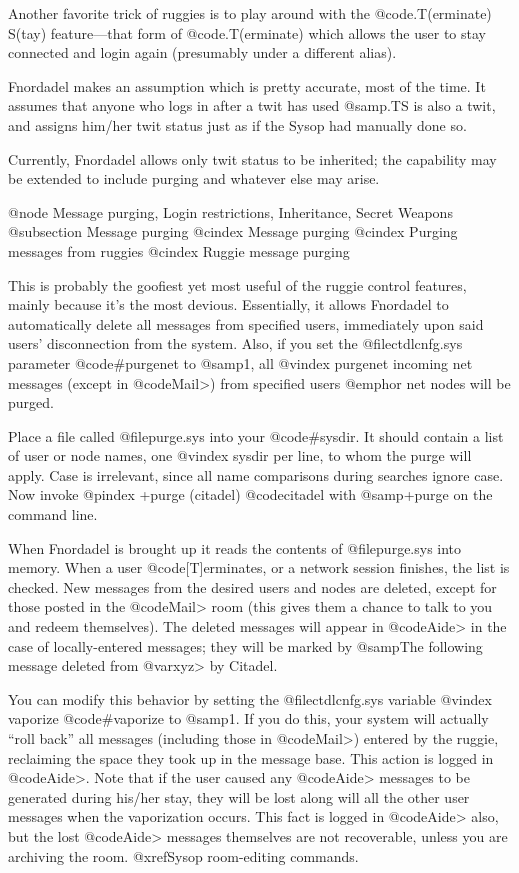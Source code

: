 Another favorite trick of ruggies is to play
around with the @code{.T(erminate) S(tay)} feature---that form
of @code{.T(erminate)} which allows the user to stay connected
and login again (presumably under a different alias).

Fnordadel makes an assumption which is pretty
accurate, most of the time.  It assumes that anyone who
logs in after a twit has used @samp{.TS} is also a twit, and
assigns him/her twit status just as if the Sysop had
manually done so.

Currently, Fnordadel allows only twit status
to be inherited; the capability may be extended to
include purging and whatever else may arise.

@node Message purging, Login restrictions, Inheritance, Secret Weapons
@subsection Message purging
@cindex Message purging
@cindex Purging messages from ruggies
@cindex Ruggie message purging

This is probably the goofiest yet most useful of the ruggie
control features, mainly because it's the most devious.
Essentially, it allows Fnordadel to automatically
delete all messages from specified users, immediately
upon said users' disconnection from the system.  Also, if
you set the @file{ctdlcnfg.sys} parameter @code{#purgenet} to @samp{1}, all
@vindex purgenet
incoming net messages (except in @code{Mail>}) from specified
users @emph{or net nodes} will be purged.

Place a file called @file{purge.sys} into your
@code{#sysdir}.  It should contain a list of user or node names, one
@vindex sysdir
per line, to whom the purge will apply.  Case is irrelevant,
since all name comparisons during searches ignore case.  Now invoke
@pindex +purge (citadel)
@code{citadel} with @samp{+purge} on the command line.

When Fnordadel is brought up it reads the
contents of @file{purge.sys} into memory.  When a user
@code{[T]erminate}s, or a network session finishes, the list is checked.
New messages from the desired users and nodes are deleted, except for those
posted in the @code{Mail>} room (this gives them a chance to talk to you
and redeem themselves).
The deleted messages will appear in @code{Aide>} in the case of
locally-entered messages; they will be marked by @samp{The following
message deleted from @var{xyz}> by Citadel}.

You can modify this behavior by setting the @file{ctdlcnfg.sys} variable
@vindex vaporize
@code{#vaporize} to @samp{1}.  If you do this, your system will actually
``roll back'' all messages (including those in @code{Mail>}) entered by the
ruggie, reclaiming the space
they took up in the message base.  This action is logged in @code{Aide>}.
Note that if the user caused any @code{Aide>} messages to be generated during
his/her stay, they will be lost along will all the other user messages when
the vaporization occurs.  This fact is logged in @code{Aide>} also, but the
lost @code{Aide>} messages themselves are not recoverable,
unless you are archiving the room.  @xref{Sysop room-editing commands}.

